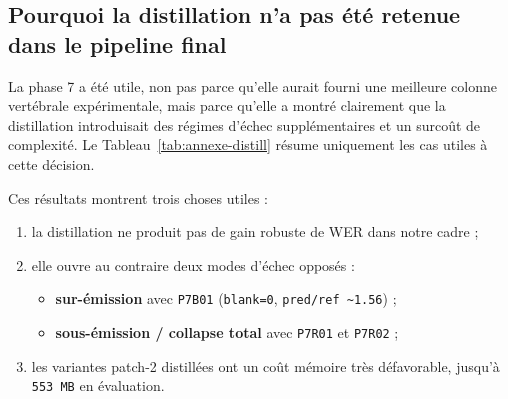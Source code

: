 \documentclass[11pt,a4paper]{article}
\begin{document}
\subsection{Pourquoi la distillation n'a pas \'et\'e retenue dans le pipeline final}
La phase 7 a \'et\'e utile, non pas parce qu'elle aurait fourni une meilleure colonne vert\'ebrale exp\'erimentale, mais parce qu'elle a montr\'e clairement que la distillation introduisait des r\'egimes d'\'echec suppl\'ementaires et un surco\^ut de complexit\'e. Le Tableau~\ref{tab:annexe-distill} r\'esume uniquement les cas utiles \`a cette d\'ecision.

\begin{table}[H]
\centering
\caption{Exp\'eriences ant\'erieures utiles \`a la d\'ecision d'exclure la distillation}
\label{tab:annexe-distill}
\end{table}

Ces r\'esultats montrent trois choses utiles :
\begin{enumerate}[leftmargin=1.2cm]
\item la distillation ne produit pas de gain robuste de WER dans notre cadre ;
\item elle ouvre au contraire deux modes d'\'echec oppos\'es :
  \begin{itemize}
  \item \textbf{sur-\'emission} avec \texttt{P7B01} (\texttt{blank=0}, \texttt{pred/ref \textasciitilde 1.56}) ;
  \item \textbf{sous-\'emission / collapse total} avec \texttt{P7R01} et \texttt{P7R02} ;
  \end{itemize}
\item les variantes patch-2 distill\'ees ont un co\^ut m\'emoire tr\`es d\'efavorable, jusqu'\`a \texttt{553 MB} en \'evaluation.
\end{enumerate}
\end{document}
